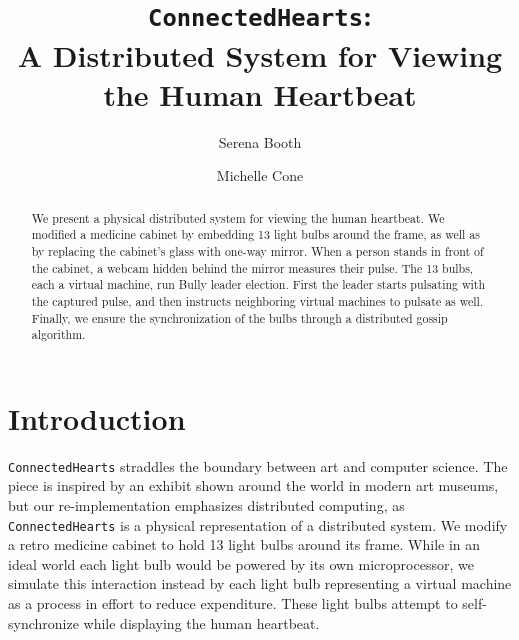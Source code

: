 \documentclass[preprint,review,12pt]{cs262}
\begin{document}
\begin{frontmatter}

\title{\texttt{ConnectedHearts}: \\ A Distributed System for Viewing the Human Heartbeat}

\author[label1, label0]{Serena Booth}
\address[label1]{sbooth@college.harvard.edu}


\author[label2, label0]{Michelle Cone}
\address[label2]{mcone@college.harvard.edu}


\begin{abstract}
We present a physical distributed system for viewing the human heartbeat. We modified a medicine cabinet by embedding 13 light bulbs around the frame, as well as by replacing the cabinet's glass with one-way mirror. When a person stands in front of the cabinet, a webcam hidden behind the mirror measures their pulse. The 13 bulbs, each a virtual machine, run Bully leader election. First the leader starts pulsating with the captured pulse, and then instructs neighboring virtual machines to pulsate as well. Finally, we ensure the synchronization of the bulbs through a distributed gossip algorithm.
\end{abstract}


\end{frontmatter}



\section{Introduction}
\label{sec1}

\texttt{ConnectedHearts} straddles the boundary between art and computer science. The piece is inspired by an exhibit shown around the world in modern art museums, but our re-implementation emphasizes distributed computing, as \texttt{ConnectedHearts} is a physical representation of a distributed system. We modify a retro medicine cabinet to hold 13 light bulbs around its frame. While in an ideal world each light bulb would be powered by its own microprocessor, we simulate this interaction instead by each light bulb representing a virtual machine as a process in effort to reduce expenditure. These light bulbs attempt to self-synchronize while displaying the human heartbeat. 
\end{document}
